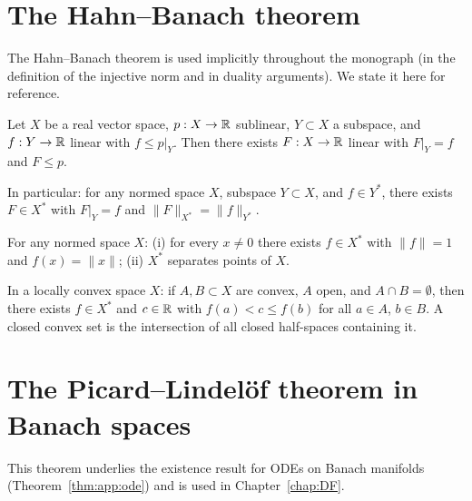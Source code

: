 \section{The Hahn--Banach theorem}
\label{app:functional:hahnbanach}

The Hahn--Banach theorem is used implicitly throughout the monograph
(in the definition of the injective norm and in duality arguments).
We state it here for reference.

\begin{theorem}
\label{thm:app:hahn_banach}
Let $X$ be a real vector space, $p:X\to\mathbb{R}$ sublinear, $Y\subset X$
a subspace, and $f:Y\to\mathbb{R}$ linear with $f\leq p|_Y$. Then there
exists $F:X\to\mathbb{R}$ linear with $F|_Y=f$ and $F\leq p$.

In particular: for any normed space $X$, subspace $Y\subset X$, and
$f\in Y^*$, there exists $F\in X^*$ with $F|_Y=f$ and
$\|F\|_{X^*}=\|f\|_{Y^*}$.
\end{theorem}

\begin{corollary}
\label{cor:app:hb_separation}
For any normed space $X$: \textup{(i)} for every $x\neq 0$ there
exists $f\in X^*$ with $\|f\|=1$ and $f(x)=\|x\|$;
\textup{(ii)} $X^*$ separates points of $X$.
\end{corollary}

\begin{theorem}
\label{thm:app:hb_separation}
In a locally convex space $X$: if $A,B\subset X$ are convex, $A$
open, and $A\cap B=\emptyset$, then there exists $f\in X^*$ and
$c\in\mathbb{R}$ with $f(a)<c\leq f(b)$ for all $a\in A$, $b\in B$.
A closed convex set is the intersection of all closed half-spaces
containing it.
\end{theorem}

\section{The Picard--Lindelöf theorem in Banach spaces}
\label{app:functional:cauchy}

This theorem underlies the existence result for ODEs on Banach
manifolds (Theorem~\ref{thm:app:ode}) and is used in
Chapter~\ref{chap:DF}.

